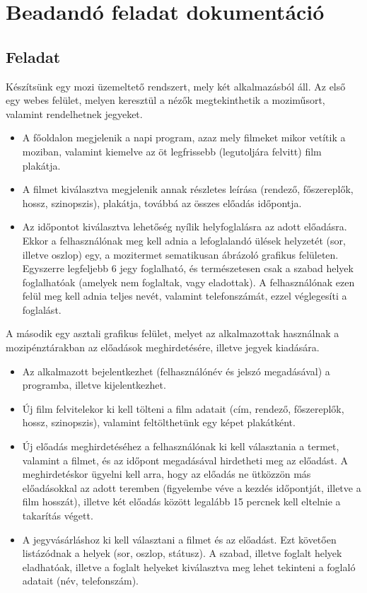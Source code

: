 \documentclass{article}
\begin{document}
	\section*{Beadandó feladat dokumentáció}
	\subsection*{Feladat}
	Készítsünk egy mozi üzemeltető rendszert, mely két alkalmazásból áll. Az első egy webes felület, melyen keresztül a nézők megtekinthetik a moziműsort, valamint rendelhetnek jegyeket.
	\begin{itemize}
		\item A főoldalon megjelenik a napi program, azaz mely filmeket mikor vetítik a moziban, valamint kiemelve az öt legfrissebb (legutoljára felvitt) film plakátja.
		\item A filmet kiválasztva megjelenik annak részletes leírása (rendező, főszereplők, hossz, szinopszis), plakátja, továbbá az összes előadás időpontja.
		\item Az időpontot kiválasztva lehetőség nyílik helyfoglalásra az adott előadásra. Ekkor a felhasználónak meg kell adnia a lefoglalandó ülések helyzetét (sor, illetve oszlop) egy, a mozitermet sematikusan ábrázoló grafikus felületen. Egyszerre legfeljebb 6 jegy foglalható, és természetesen csak a szabad helyek foglalhatóak (amelyek nem foglaltak, vagy eladottak). A felhasználónak ezen felül meg kell adnia teljes nevét, valamint telefonszámát, ezzel véglegesíti a foglalást.
	\end{itemize}
	A második egy asztali grafikus felület, melyet az alkalmazottak használnak a mozipénztárakban az előadások meghirdetésére, illetve jegyek kiadására.
	\begin{itemize}
		\item Az alkalmazott bejelentkezhet (felhasználónév és jelszó megadásával) a programba, illetve kijelentkezhet.
		\item Új film felvitelekor ki kell tölteni a film adatait (cím, rendező, főszereplők, hossz, szinopszis), valamint feltölthetünk egy képet plakátként.
		\item Új előadás meghirdetéséhez a felhasználónak ki kell választania a termet, valamint a filmet, és az időpont megadásával hirdetheti meg az előadást. A meghirdetéskor ügyelni kell arra, hogy az előadás ne ütközzön más előadásokkal az adott teremben (figyelembe véve a kezdés időpontját, illetve a film hosszát), illetve két előadás között legalább 15 percnek kell eltelnie a takarítás végett.
		\item A jegyvásárláshoz ki kell választani a filmet és az előadást. Ezt követően listázódnak a helyek (sor, oszlop, státusz). A szabad, illetve foglalt helyek eladhatóak, illetve a foglalt helyeket kiválasztva meg lehet tekinteni a foglaló adatait (név, telefonszám).
	\end{itemize}
\end{document}
